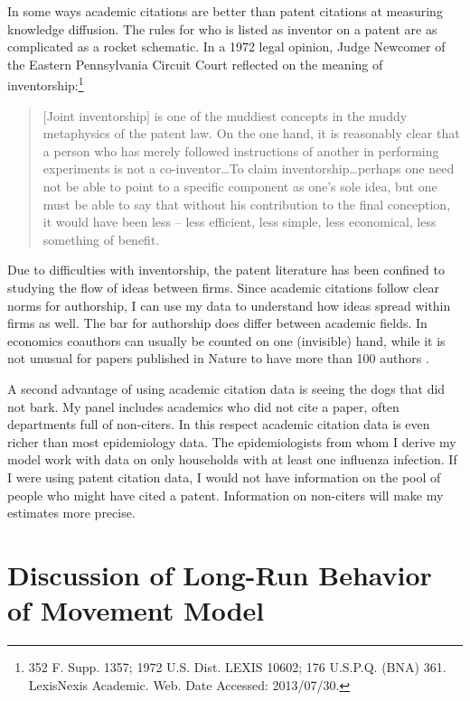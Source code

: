 In some ways academic citations are better than patent citations at
measuring knowledge diffusion. The rules for who is listed as inventor
on a patent are as complicated as a rocket schematic. In a 1972 legal
opinion, Judge Newcomer of the Eastern Pennsylvania Circuit Court
reflected on the meaning of
inventorship:\footnote{352 F. Supp. 1357; 1972 U.S. Dist. LEXIS 10602; 176 U.S.P.Q. (BNA) 361. LexisNexis Academic. Web. Date Accessed: 2013/07/30.}

\begin{quote}
{[}Joint inventorship{]} is one of the muddiest concepts in the muddy
metaphysics of the patent law. On the one hand, it is reasonably clear
that a person who has merely followed instructions of another in
performing experiments is not a co-inventor\ldots{}To claim
inventorship\ldots perhaps one need not be able to point to a specific
component as one's sole idea, but one must be able to say that without
his contribution to the final conception, it would have been less --
less efficient, less simple, less economical, less something of benefit.
\end{quote}

Due to difficulties with inventorship, the patent literature has been
confined to studying the flow of ideas between firms. Since academic
citations follow clear norms for authorship, I can use my data to
understand how ideas spread within firms as well. The bar for authorship
does differ between academic fields. In economics coauthors can usually
be counted on one (invisible) hand, while it is not unusual for papers
published in Nature to have more than 100 authors
\citep{greene2007demise}.

A second advantage of using academic citation data is seeing the dogs
that did not bark. My panel includes academics who did not cite a paper,
often departments full of non-citers. In this respect academic citation
data is even richer than most epidemiology data. The epidemiologists
from whom I derive my model work with data on only households with at
least one influenza infection. If I were using patent citation data, I
would not have information on the pool of people who might have cited a
patent. Information on non-citers will make my estimates more precise.

\clearpage
\section{Discussion of Long-Run Behavior of Movement Model}
\label{sec:movdists}

